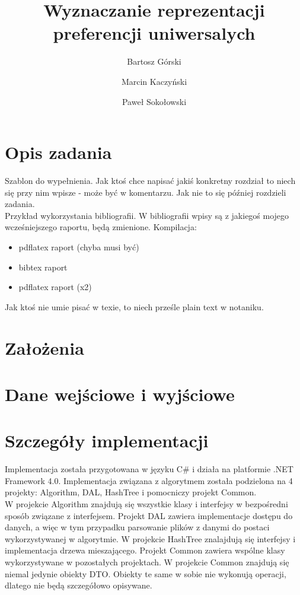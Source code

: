 \documentclass[a4paper,12pt]{article}
\title{Wyznaczanie reprezentacji preferencji uniwersalych}
\author{Bartosz Górski \and Marcin Kaczyński \and Paweł Sokołowski}
\begin{document}
\maketitle

\section{Opis zadania} 

Szablon do wypełnienia. Jak ktoś chce napisać jakiś konkretny rozdział to niech się przy nim wpisze - może być w komentarzu. 
Jak nie to się później rozdzieli zadania.\\

Przykład wykorzystania bibliografii\cite{fst}. W bibliografii wpisy są z jakiegoś mojego wcześniejszego raportu, będą zmienione. Kompilacja:

\begin{itemize}
\item pdflatex raport (chyba musi być)
\item bibtex raport
\item pdflatex raport (x2)
\end{itemize}

Jak ktoś nie umie pisać w texie, to niech prześle plain text w notaniku.

\section{Założenia}
\section{Dane wejściowe i wyjściowe}
\section{Szczegóły implementacji}

Implementacja została przygotowana w języku C\# i działa na platformie .NET Framework 4.0. Implementacja związana z algorytmem została podzielona na 4 projekty: Algorithm, DAL, HashTree i pomocniczy projekt Common.\\

W projekcie Algorithm znajdują się wszystkie klasy i interfejsy w bezpośredni sposób związane z interfejsem. Projekt DAL zawiera implementacje dostępu do danych, a więc w tym przypadku parsowanie plików z danymi do postaci wykorzystywanej w algorytmie. W projekcie HashTree znalajdują się interfejsy i implementacja drzewa mieszającego. Projekt Common zawiera wspólne klasy wykorzystywane w pozostałych projektach. W projekcie Common znajdują się niemal jedynie obiekty DTO. Obiekty te same w sobie nie wykonują operacji, dlatego nie będą szczegółowo opisywane.\\
\end{document}
